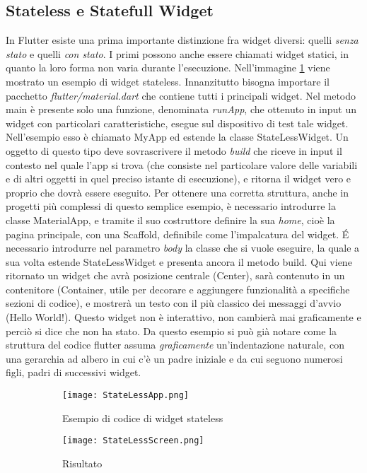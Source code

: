 	\subsection{Stateless e Statefull Widget}
	In Flutter esiste una prima importante distinzione fra widget diversi:
	quelli \textit{senza stato} e quelli \textit{con stato}. I primi possono
	anche essere chiamati widget statici, in quanto la loro forma non varia
	durante l'esecuzione. Nell'immagine \ref{stateless1}  viene mostrato un esempio di widget
	stateless. Innanzitutto bisogna importare il pacchetto
	\textit{flutter/material.dart} che contiene tutti i principali widget. Nel
	metodo main è presente solo una funzione, denominata \textit{runApp}, che
	ottenuto in input un widget con particolari caratteristiche, esegue sul
	dispositivo di test tale widget. Nell'esempio esso è chiamato MyApp ed
	estende la classe StateLessWidget. Un oggetto di questo tipo deve
	sovrascrivere il metodo \textit{build} che riceve in input il contesto nel
	quale l'app si trova (che consiste nel particolare valore delle variabili e
	di altri oggetti in quel preciso istante di esecuzione), e ritorna il widget
	vero e proprio che dovrà essere eseguito. Per ottenere una corretta
	struttura, anche in progetti più complessi di questo semplice esempio, è
	necessario introdurre la classe MaterialApp, e tramite il suo costruttore
	definire la sua \textit{home}, cioè la pagina principale, con una Scaffold,
	definibile come l'impalcatura del widget. \'E necessario introdurre nel parametro
	\textit{body} la classe che si vuole eseguire, la quale a sua volta estende
	StateLessWidget e presenta ancora il metodo build. Qui viene ritornato un
	widget che avrà posizione centrale (Center), sarà contenuto in un
	contenitore (Container, utile per decorare e aggiungere funzionalità a
	specifiche sezioni di codice), e mostrerà un testo con il più classico dei
	messaggi d'avvio (Hello World!). Questo widget non è interattivo, non
	cambierà mai graficamente e perciò si dice che non ha stato.
	 Da questo esempio si può già notare come la
	struttura del codice flutter assuma \textit{graficamente} un'indentazione
	naturale, con una gerarchia ad albero in cui c'è un padre iniziale e da cui
	seguono numerosi figli, padri di successivi widget.

	\begin{figure}[h!]
		\centering
		\begin{subfigure}{0.6\linewidth}
			\texttt{[image: StateLessApp.png]}
			\caption{Esempio di codice di widget stateless}
		\end{subfigure}
		\begin{subfigure}{0.3\linewidth}
			\texttt{[image: StateLessScreen.png]}
			\caption{Risultato}
		\end{subfigure}
		\caption{}
		\label{stateless1}
	\end{figure} 

